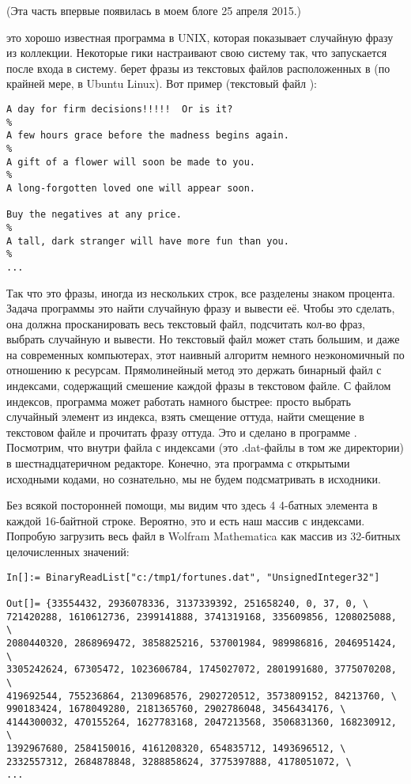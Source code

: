 
(Эта часть впервые появилась в моем блоге 25 апреля 2015.)

 это хорошо известная программа в UNIX, которая показывает случайную фразу из коллекции.
Некоторые гики настраивают свою систему так, что  запускается после входа в систему.
 берет фразы из текстовых файлов расположенных в  (по крайней мере, в Ubuntu Linux).
Вот пример (текстовый файл ):

\begin{lstlisting}
A day for firm decisions!!!!!  Or is it?
%
A few hours grace before the madness begins again.
%
A gift of a flower will soon be made to you.
%
A long-forgotten loved one will appear soon.

Buy the negatives at any price.
%
A tall, dark stranger will have more fun than you.
%
...
\end{lstlisting}

Так что это фразы, иногда из нескольких строк, все разделены знаком процента.
Задача программы  это найти случайную фразу и вывести её.
Чтобы это сделать, она должна просканировать весь текстовый файл, подсчитать кол-во фраз, выбрать случайную и вывести.
Но текстовый файл может стать большим, и даже на современных компьютерах, этот наивный алгоритм немного неэкономичный
по отношению к ресурсам.
Прямолинейный метод это держать бинарный файл с индексами, содержащий смешение каждой фразы в текстовом файле.
С файлом индексов, программа  может работать намного быстрее: просто выбрать случайный элемент из индекса,
взять смещение оттуда, найти смещение в текстовом файле и прочитать фразу оттуда.
Это и сделано в программе .
Посмотрим, что внутри файла с индексами (это .dat-файлы в том же директории) в шестнадцатеричном редакторе.
Конечно, эта программа с открытыми исходными кодами, но сознательно, мы не будем подсматривать в исходники.



Без всякой посторонней помощи, мы видим что здесь 4 4-батных элемента в каждой 16-байтной строке.
Вероятно, это и есть наш массив с индексами.
Попробую загрузить весь файл в Wolfram Mathematica как массив из 32-битных целочисленных значений:

\begin{lstlisting}[style=custommath]
In[]:= BinaryReadList["c:/tmp1/fortunes.dat", "UnsignedInteger32"]

Out[]= {33554432, 2936078336, 3137339392, 251658240, 0, 37, 0, \
721420288, 1610612736, 2399141888, 3741319168, 335609856, 1208025088, \
2080440320, 2868969472, 3858825216, 537001984, 989986816, 2046951424, \
3305242624, 67305472, 1023606784, 1745027072, 2801991680, 3775070208, \
419692544, 755236864, 2130968576, 2902720512, 3573809152, 84213760, \
990183424, 1678049280, 2181365760, 2902786048, 3456434176, \
4144300032, 470155264, 1627783168, 2047213568, 3506831360, 168230912, \
1392967680, 2584150016, 4161208320, 654835712, 1493696512, \
2332557312, 2684878848, 3288858624, 3775397888, 4178051072, \
...
\end{lstlisting}

